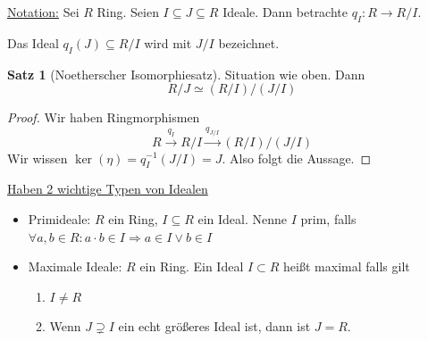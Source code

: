\documentclass[12pt,parskip=full]{scrartcl}
\newcommand{\heading}{\underline}
\theoremstyle{definition}
\newtheorem{theorem}{Satz}[section]
\theoremstyle{remark}
\begin{document}
	\heading{Notation:} Sei $R$ Ring. Seien $I \subseteq J \subseteq R$ Ideale. Dann betrachte $q_I: R \to R/I$.
	
	Das Ideal $q_I(J) \subseteq R/I$ wird mit $J/I$ bezeichnet.

	\begin{theorem}[Noetherscher Isomorphiesatz]
		Situation wie oben. Dann
		\begin{equation*}
			R/J \simeq (R/I) / (J/I)
		\end{equation*}
	\end{theorem}

	\begin{proof}
		Wir haben Ringmorphismen
		\begin{equation*}
			R \overset{q_I}{\longrightarrow} R/I \overset{q_{J/I}}{\longrightarrow} (R/I) / (J/I)
		\end{equation*}
		Wir wissen $\ker(\eta) = q_I^{-1}(J/I) = J$. Also folgt die Aussage.
	\end{proof}

	\heading{Haben 2 wichtige Typen von Idealen}
	\begin{itemize}
		\item Primideale: $R$ ein Ring, $I \subseteq R$ ein Ideal. Nenne $I$ prim, falls $\forall a,b \in R: a \cdot b \in I \Rightarrow a \in I \lor b \in I$
		\item Maximale Ideale: $R$ ein Ring. Ein Ideal $I \subset R$ heißt maximal falls gilt
		\begin{enumerate}
			\item $I \neq R$
			\item Wenn $J \supsetneq I$ ein echt größeres Ideal ist, dann ist $J = R$.
		\end{enumerate}
	\end{itemize}
\end{document}
